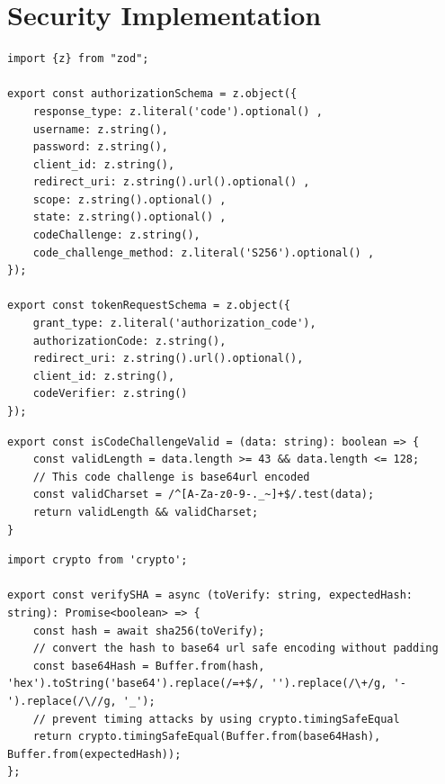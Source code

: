 \appendix
\chapter{Security Implementation}




\begin{lstlisting}[style=typescript,caption=Input Validation,label=apendix:input_val]
import {z} from "zod";

export const authorizationSchema = z.object({
    response_type: z.literal('code').optional() ,
    username: z.string(),
    password: z.string(),
    client_id: z.string(),
    redirect_uri: z.string().url().optional() ,
    scope: z.string().optional() ,
    state: z.string().optional() ,
    codeChallenge: z.string(),
    code_challenge_method: z.literal('S256').optional() ,
});

export const tokenRequestSchema = z.object({
    grant_type: z.literal('authorization_code'),
    authorizationCode: z.string(),
    redirect_uri: z.string().url().optional(),
    client_id: z.string(),
    codeVerifier: z.string()
});

\end{lstlisting}

\newpage
\begin{lstlisting}[style=typescript,caption=Code Challenge Validation,label=apendix:code_chal_val]
export const isCodeChallengeValid = (data: string): boolean => {
    const validLength = data.length >= 43 && data.length <= 128;
    // This code challenge is base64url encoded
    const validCharset = /^[A-Za-z0-9-._~]+$/.test(data);
    return validLength && validCharset;
}
\end{lstlisting}

\begin{lstlisting}[style=typescript,caption=Code Challenge Timing safe comparisons,label=apendix:timing_safe_comparions]
import crypto from 'crypto';

export const verifySHA = async (toVerify: string, expectedHash: string): Promise<boolean> => {
    const hash = await sha256(toVerify);
    // convert the hash to base64 url safe encoding without padding
    const base64Hash = Buffer.from(hash, 'hex').toString('base64').replace(/=+$/, '').replace(/\+/g, '-').replace(/\//g, '_');
    // prevent timing attacks by using crypto.timingSafeEqual
    return crypto.timingSafeEqual(Buffer.from(base64Hash), Buffer.from(expectedHash));
};
\end{lstlisting}

